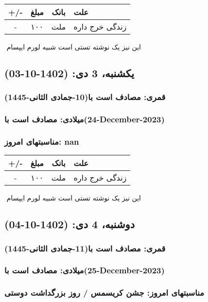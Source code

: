 \documentclass{article}
\newcommand{\rnote}[1]{\marginpar{\textcolor{color}{\StrSubstitute{\##1}{ }{\_}}}}
\newcommand{\myRow}[4]{
    #1 & #2 & #3 & #4 \\ \hline
}
\begin{document}
\begin{tabular}{ | c | c | c | p{5cm} |}
    \hline
    \myRow{ +/- }{مبلغ}{بانک}{علت}
    \myRow{-}{۱۰۰}{ملت}{زندگی خرج داره}
\end{tabular}
\newline
\newline

‌
\rnote{تست}
این نیز یک نوشته تستی است شبیه لورم ایپسام




\newpage
{}
\textcolor{color}{
\section{ یکشنبه، 3 دی: (1402-10-03) }
\subsubsection*{قمری: مصادف است با(10-جمادی الثانی-1445)} 
\subsubsection*{میلادی: مصادف است با(24-December-2023)}
\subsubsection*{مناسبتهای امروز: nan}
}


\begin{tabular}{ | c | c | c | p{5cm} |}
    \hline
    \myRow{ +/- }{مبلغ}{بانک}{علت}
    \myRow{-}{۱۰۰}{ملت}{زندگی خرج داره}
\end{tabular}
\newline
\newline

‌
\rnote{تست}
این نیز یک نوشته تستی است شبیه لورم ایپسام




\newpage
{}
\textcolor{color}{
\section{ دوشنبه، 4 دی: (1402-10-04) }
\subsubsection*{قمری: مصادف است با(11-جمادی الثانی-1445)} 
\subsubsection*{میلادی: مصادف است با(25-December-2023)}
\subsubsection*{مناسبتهای امروز: جشن کریسمس / روز بزرگداشت دوستی }
}
\end{document}
